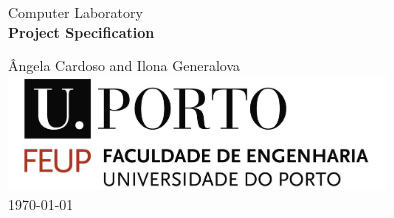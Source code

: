 

\begin{titlepage}
\begin{center}
 
\vspace*{3cm}

{\Large Computer Laboratory}\\[2cm]

{\Huge \bfseries Project Specification \\[1cm]}

{\large \^Angela Cardoso and Ilona Generalova}\\[2cm]

\includegraphics[width=10cm]{feup_logo.jpg}\\[2cm]


{\large \today}

\end{center}
\end{titlepage}